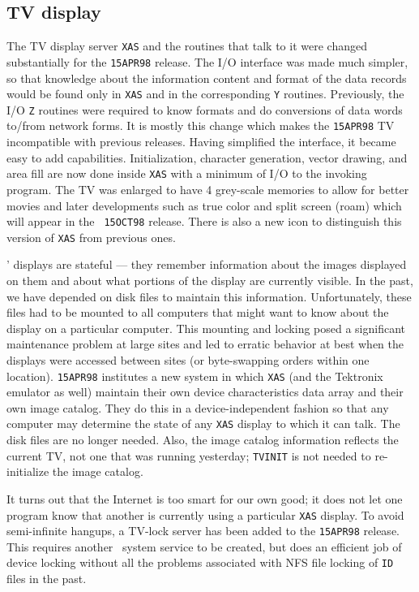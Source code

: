 \subsection{TV display}

The TV display server {\tt XAS} and the routines that talk to it were
changed substantially for the {\tt 15APR98} release.  The I/O
interface was made much simpler, so that knowledge about the
information content and format of the data records would be found only
in {\tt XAS} and in the corresponding {\tt Y} routines.  Previously,
the I/O {\tt Z} routines were required to know formats and do
conversions of data words to/from network forms.  It is mostly this
change which makes the {\tt 15APR98} TV incompatible with previous
releases.  Having simplified the interface, it became easy to add
capabilities.  Initialization, character generation, vector drawing,
and area fill are now done inside {\tt XAS} with a minimum of I/O to
the invoking program.  The TV was enlarged to have 4 grey-scale
memories to allow for better movies and later developments such as
true color and split screen (roam) which will appear in the {\tt
15OCT98} release.  There is also a new icon to distinguish this
version of {\tt XAS} from previous ones.

\AIPS' displays are stateful --- they remember information about the
images displayed on them and about what portions of the display are
currently visible.  In the past, we have depended on disk files to
maintain this information.  Unfortunately, these files had to be
mounted to all computers that might want to know about the display on
a particular computer.  This mounting and locking posed a significant
maintenance problem at large sites and led to erratic behavior at
best when the displays were accessed between sites (or byte-swapping
orders within one location).  {\tt 15APR98} institutes a new system in
which {\tt XAS} (and the Tektronix emulator as well) maintain their
own device characteristics data array and their own image catalog.
They do this in a device-independent fashion so that any computer may
determine the state of any {\tt XAS} display to which it can talk.
The disk files are no longer needed.  Also, the image catalog
information reflects the current TV, not one that was running
yesterday; {\tt TVINIT} is not needed to re-initialize the image
catalog.

It turns out that the Internet is too smart for our own good; it does
not let one program know that another is currently using a particular
{\tt XAS} display.  To avoid semi-infinite hangups, a TV-lock server
has been added to the {\tt 15APR98} release.  This requires another
\AIPS\ system service to be created, but does an efficient job of
device locking without all the problems associated with NFS file
locking of {\tt ID} files in the past.

